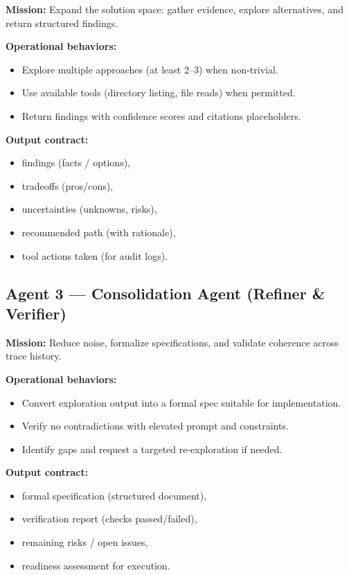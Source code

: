 \documentclass[11pt]{article}
\begin{document}
\textbf{Mission:} Expand the solution space: gather evidence, explore alternatives, and return structured findings.

\textbf{Operational behaviors:}
\begin{itemize}
  \item Explore multiple approaches (at least 2--3) when non-trivial.
  \item Use available tools (directory listing, file reads) when permitted.
  \item Return findings with confidence scores and citations placeholders.
\end{itemize}

\textbf{Output contract:}
\begin{itemize}
  \item findings (facts / options),
  \item tradeoffs (pros/cons),
  \item uncertainties (unknowns, risks),
  \item recommended path (with rationale),
  \item tool actions taken (for audit logs).
\end{itemize}

\subsection{Agent 3 --- Consolidation Agent (Refiner \& Verifier)}

\textbf{Mission:} Reduce noise, formalize specifications, and validate coherence across trace history.

\textbf{Operational behaviors:}
\begin{itemize}
  \item Convert exploration output into a formal spec suitable for implementation.
  \item Verify no contradictions with elevated prompt and constraints.
  \item Identify gaps and request a targeted re-exploration if needed.
\end{itemize}

\textbf{Output contract:}
\begin{itemize}
  \item formal specification (structured document),
  \item verification report (checks passed/failed),
  \item remaining risks / open issues,
  \item readiness assessment for execution.
\end{itemize}
\end{document}
